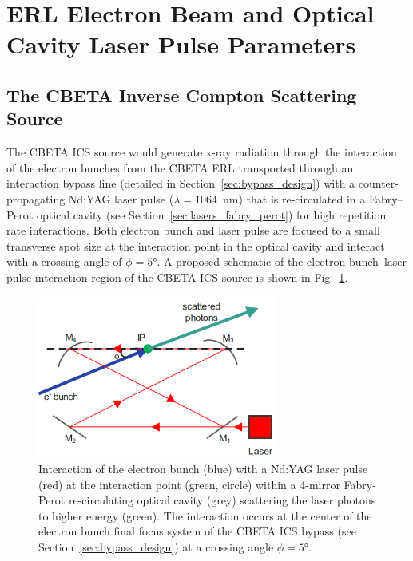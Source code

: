 \documentclass[../main.tex]{subfiles}
\begin{document}
\section{ERL Electron Beam and Optical Cavity Laser Pulse Parameters}
\label{sec:CBETA_electron_laser_parameters}

\subsection{The CBETA Inverse Compton Scattering Source}
\label{sec:CBETA_ICS_source_description}

The CBETA ICS source would generate x-ray radiation through the interaction of the electron bunches from the CBETA ERL transported through an interaction bypass line (detailed in Section~\ref{sec:bypass_design}) with a counter-propagating Nd:YAG laser pulse ($\lambda=1064$~\si{\nano\meter}) that is re-circulated in a Fabry--Perot optical cavity (see Section~\ref{sec:lasers_fabry_perot}) for high repetition rate interactions. Both electron bunch and laser pulse are focused to a small transverse spot size at the interaction point in the optical cavity and interact with a crossing angle of $\phi =5$\si{\degree}. A proposed schematic of the electron bunch--laser pulse interaction region of the CBETA ICS source is shown in Fig.~\ref{fig:CBETA_ICS_Interaction}. 
\begin{figure}[!h]
\centering
\includegraphics[width=0.7\textwidth]{Figures/CBETA_Inverse_Compton_Source_Design/CBETA_interaction_fixed.pdf}
\caption{Interaction of the electron bunch (blue) with a Nd:YAG laser pulse (red) at the interaction point (green, circle) within a 4-mirror Fabry-Perot re-circulating optical cavity (grey) scattering the laser photons to higher energy (green). The interaction occurs at the center of the electron bunch final focus system of the CBETA ICS bypass (see Section~\ref{sec:bypass_design}) at a crossing angle $\phi=5$\si{\degree}.}
\label{fig:CBETA_ICS_Interaction}
\end{figure}
\end{document}
